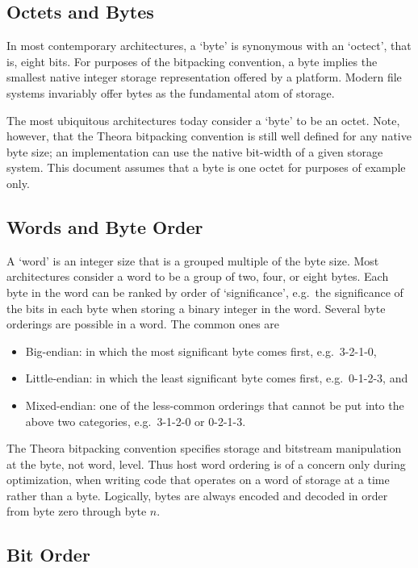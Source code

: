 \documentclass[9pt,letterpaper]{book}
\numberwithin{equation}{chapter}
\numberwithin{figure}{chapter}
\numberwithin{table}{chapter}
\begin{document}
\subsection{Octets and Bytes}

In most contemporary architectures, a `byte' is synonymous with an `octect',
 that is, eight bits.
For purposes of the bitpacking convention, a byte implies the smallest native
 integer storage representation offered by a platform.
Modern file systems invariably offer bytes as the fundamental atom of storage.

The most ubiquitous architectures today consider a `byte' to be an octet.
Note, however, that the Theora bitpacking convention is still well defined for
 any native byte size; an implementation can use the native bit-width of a
 given storage system.
This document assumes that a byte is one octet for purposes of example only.

\subsection{Words and Byte Order}

A `word' is an integer size that is a grouped multiple of the byte size.
Most architectures consider a word to be a group of two, four, or eight bytes.
Each byte in the word can be ranked by order of `significance', e.g.\ the
 significance of the bits in each byte when storing a binary integer in the
 word.
Several byte orderings are possible in a word.
The common ones are
\begin{itemize}
\item{Big-endian:}
in which the most significant byte comes first, e.g.\ 3-2-1-0,
\item{Little-endian:}
in which the least significant byte comes first, e.g.\ 0-1-2-3, and
\item{Mixed-endian:}
one of the less-common orderings that cannot be put into the above two
 categories, e.g.\ 3-1-2-0 or 0-2-1-3.
\end{itemize}

The Theora bitpacking convention specifies storage and bitstream manipulation
 at the byte, not word, level.
Thus host word ordering is of a concern only during optimization, when writing
 code that operates on a word of storage at a time rather than a byte.
Logically, bytes are always encoded and decoded in order from byte zero through
 byte $n$.

\subsection{Bit Order}
\end{document}
